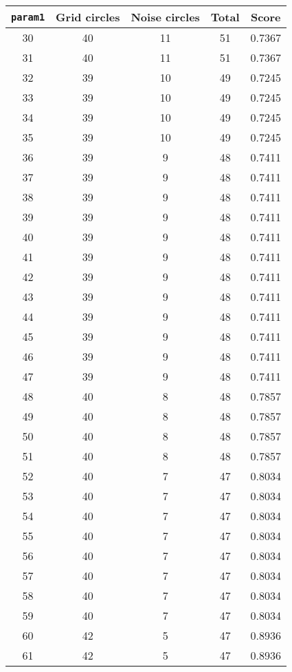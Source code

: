 \documentclass[letterpaper, 12pt]{article}
\begin{document}
\begin{longtable}{|c|c|c|c|c|}
\hline
\textbf{\texttt{param1}} & \textbf{Grid circles} & \textbf{Noise circles} & \textbf{Total} & \textbf{Score} \\
\hline
30 & 40 & 11 & 51 & 0.7367 \\
\hline
31 & 40 & 11 & 51 & 0.7367 \\
\hline
32 & 39 & 10 & 49 & 0.7245 \\
\hline
33 & 39 & 10 & 49 & 0.7245 \\
\hline
34 & 39 & 10 & 49 & 0.7245 \\
\hline
35 & 39 & 10 & 49 & 0.7245 \\
\hline
36 & 39 & 9 & 48 & 0.7411 \\
\hline
37 & 39 & 9 & 48 & 0.7411 \\
\hline
38 & 39 & 9 & 48 & 0.7411 \\
\hline
39 & 39 & 9 & 48 & 0.7411 \\
\hline
40 & 39 & 9 & 48 & 0.7411 \\
\hline
41 & 39 & 9 & 48 & 0.7411 \\
\hline
42 & 39 & 9 & 48 & 0.7411 \\
\hline
43 & 39 & 9 & 48 & 0.7411 \\
\hline
44 & 39 & 9 & 48 & 0.7411 \\
\hline
45 & 39 & 9 & 48 & 0.7411 \\
\hline
46 & 39 & 9 & 48 & 0.7411 \\
\hline
47 & 39 & 9 & 48 & 0.7411 \\
\hline
48 & 40 & 8 & 48 & 0.7857 \\
\hline
49 & 40 & 8 & 48 & 0.7857 \\
\hline
50 & 40 & 8 & 48 & 0.7857 \\
\hline
51 & 40 & 8 & 48 & 0.7857 \\
\hline
52 & 40 & 7 & 47 & 0.8034 \\
\hline
53 & 40 & 7 & 47 & 0.8034 \\
\hline
54 & 40 & 7 & 47 & 0.8034 \\
\hline
55 & 40 & 7 & 47 & 0.8034 \\
\hline
56 & 40 & 7 & 47 & 0.8034 \\
\hline
57 & 40 & 7 & 47 & 0.8034 \\
\hline
58 & 40 & 7 & 47 & 0.8034 \\
\hline
59 & 40 & 7 & 47 & 0.8034 \\
\hline
60 & 42 & 5 & 47 & 0.8936 \\
\hline
61 & 42 & 5 & 47 & 0.8936 \\

\end{longtable}
\end{document}
